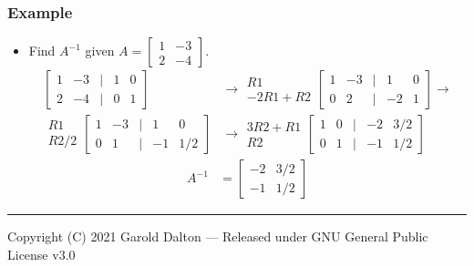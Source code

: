 \documentclass[14pt]{extarticle}
\begin{document}
\subsubsection{Example}
\begin{itemize}
	\item Find $A^{-1}$ given $A=\begin{bmatrix} 1 & -3 \\ 2 & -4	\end{bmatrix}$.
	\begin{align*}
		\begin{bmatrix}
			1 & -3 & | & 1 & 0 \\
			2 & -4 & | & 0 & 1
		\end{bmatrix} &\to
		\begin{array}{r}
			R1 \\
			-2R1 + R2
		\end{array}
		\begin{bmatrix}
			1 & -3 & | & 1 & 0 \\
			0 & 2 & | & -2 & 1
		\end{bmatrix} \to \\
		\begin{array}{r}
			R1 \\
			R2/2
		\end{array}
		\begin{bmatrix}
			1 & -3 & | & 1 & 0 \\
			0 & 1 & | & -1 & 1/2
		\end{bmatrix} &\to
		\begin{array}{r}
			3R2+R1 \\
			R2
		\end{array}
		\begin{bmatrix}
			1 & 0 & | & -2 & 3/2 \\
			0 & 1 & | & -1 & 1/2
		\end{bmatrix}
	\end{align*}
	\begin{align*}
		A^{-1} &= \begin{bmatrix} -2 & 3/2 \\ -1 & 1/2	\end{bmatrix}
	\end{align*}
\end{itemize}

\noindent\rule{\textwidth}{1pt}
{\footnotesize Copyright (C) 2021 Garold Dalton --- Released under GNU General Public License v3.0}
\end{document}
